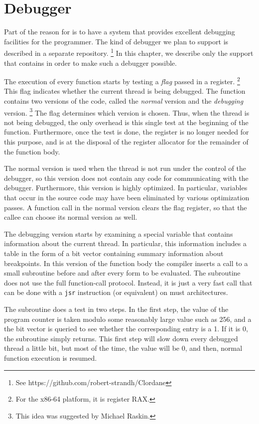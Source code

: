 \chapter{Debugger}
\label{chap-debugger}

Part of the reason for \sysname{} is to have a system that provides
excellent debugging facilities for the programmer.  The kind of
debugger we plan to support is described in a separate repository.%
\footnote{See https://github.com/robert-strandh/Clordane}  In this
chapter, we describe only the support that \sysname{} contains in
order to make such a debugger possible.

The execution of every function starts by testing a \emph{flag} passed
in a register.%
\footnote{For the x86-64 platform, it is register RAX.}
This flag indicates whether the current thread is being debugged.  The
function contains two versions of the code, called the \emph{normal}
version and the \emph{debugging} version.%
\footnote{This idea was suggested by Michael Raskin.}
The flag determines which version is chosen.  Thus, when the thread is
not being debugged, the only overhead is this single test at the
beginning of the function.  Furthermore, once the test is done, the
register is no longer needed for this purpose, and is at the disposal
of the register allocator for the remainder of the function body.

The normal version is used when the thread is not run under the
control of the debugger, so this version does not contain any code for
communicating with the debugger.  Furthermore, this version is highly
optimized.  In particular, variables that occur in the source code may
have been eliminated by various optimization passes.  A function call
in the normal version clears the flag register, so that the callee can
choose its normal version as well.

The debugging version starts by examining a special variable that
contains information about the current thread.  In particular, this
information includes a table in the form of a bit vector containing
summary information about breakpoints.  In this version of the
function body the compiler inserts a call to a small subroutine before
and after every form to be evaluated.  The subroutine does not use the
full \commonlisp{} function-call protocol.  Instead, it is just a very
fast call that can be done with a \texttt{jsr} instruction (or
equivalent) on must architectures.

The subroutine does a test in two steps.  In the first step, the value
of the program counter is taken modulo some reasonably large value
such as 256, and a the bit vector is queried to see whether the
corresponding entry is a 1.  If it is 0, the subroutine simply
returns.  This first step will slow down every debugged thread a
little bit, but most of the time, the value will be 0, and then,
normal function execution is resumed.

